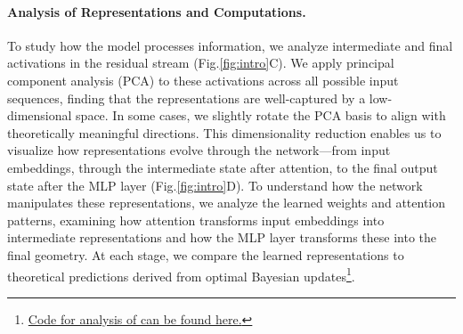 \documentclass{article}
\theoremstyle{plain}
\theoremstyle{definition}
\theoremstyle{remark}
\begin{document}
\paragraph{Analysis of Representations and Computations.} To study how the model processes information, we analyze intermediate and final activations in the residual stream (Fig.\ref{fig:intro}C). We apply principal component analysis (PCA) to these activations across all possible input sequences, finding that the representations are well-captured by a low-dimensional space. In some cases, we slightly rotate the PCA basis to align with theoretically meaningful directions. This dimensionality reduction enables us to visualize how representations evolve through the network—from input embeddings, through the intermediate state after attention, to the final output state after the MLP layer (Fig.\ref{fig:intro}D). To understand how the network manipulates these representations, we analyze the learned weights and attention patterns, examining how attention transforms input embeddings into intermediate representations and how the MLP layer transforms these into the final geometry. At each stage, we compare the learned representations to theoretical predictions derived from optimal Bayesian updates\footnote{\href{https://github.com/adamimos/epsilon-transformers/blob/main/examples/intermediate_representations.ipynb}{Code for analysis of can be found here.}}.

\end{document}
